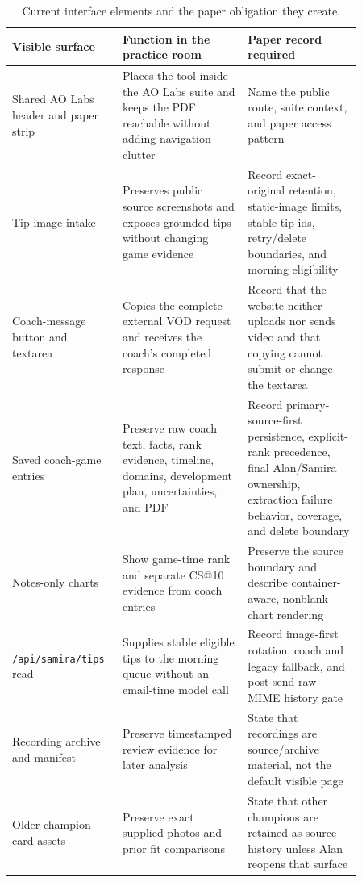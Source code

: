 \documentclass[12pt,letterpaper]{article}
\begin{document}
\begin{table}[H]
\centering
\caption{Current interface elements and the paper obligation they create.}
{\small
\setlength{\tabcolsep}{5pt}
\begin{tabular}{p{0.23\linewidth}p{0.33\linewidth}p{0.30\linewidth}}
\toprule
Visible surface & Function in the practice room & Paper record required \\
\midrule
Shared AO Labs header and paper strip & Places the tool inside the AO Labs suite and keeps the PDF reachable without adding navigation clutter & Name the public route, suite context, and paper access pattern \\
Tip-image intake & Preserves public source screenshots and exposes grounded tips without changing game evidence & Record exact-original retention, static-image limits, stable tip ids, retry/delete boundaries, and morning eligibility \\
Coach-message button and textarea & Copies the complete external VOD request and receives the coach's completed response & Record that the website neither uploads nor sends video and that copying cannot submit or change the textarea \\
Saved coach-game entries & Preserve raw coach text, facts, rank evidence, timeline, domains, development plan, uncertainties, and PDF & Record primary-source-first persistence, explicit-rank precedence, final Alan/Samira ownership, extraction failure behavior, coverage, and delete boundary \\
Notes-only charts & Show game-time rank and separate CS@10 evidence from coach entries & Preserve the source boundary and describe container-aware, nonblank chart rendering \\
\texttt{/api/samira/tips} read & Supplies stable eligible tips to the morning queue without an email-time model call & Record image-first rotation, coach and legacy fallback, and post-send raw-MIME history gate \\
Recording archive and manifest & Preserve timestamped review evidence for later analysis & State that recordings are source/archive material, not the default visible page \\
Older champion-card assets & Preserve exact supplied photos and prior fit comparisons & State that other champions are retained as source history unless Alan reopens that surface \\
\bottomrule
\end{tabular}
}
\end{table}
\end{document}
